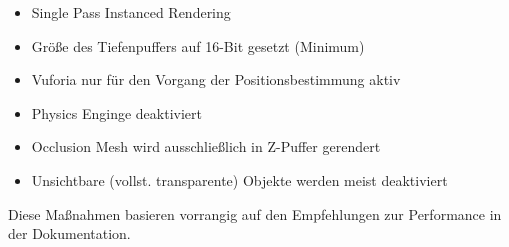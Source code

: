 \begin{itemize}
	\setlength{\itemsep}{-1pt}
	\singlespacing
	\item Single Pass Instanced Rendering
	\item Größe des Tiefenpuffers auf 16-Bit gesetzt (Minimum)
	\item Vuforia nur für den Vorgang der Positionsbestimmung aktiv
	\item Physics Enginge deaktiviert
	\item Occlusion Mesh wird ausschließlich in Z-Puffer gerendert
	\item Unsichtbare (vollst. transparente) Objekte werden meist deaktiviert
\end{itemize}

Diese Maßnahmen basieren vorrangig auf den Empfehlungen zur Performance in der Dokumentation.